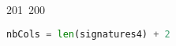 201~200~\documentclass{article}
\begin{document}
\begin{lstlisting}[language=Python, caption=LLL Algorithm to crack private key chall 4]
	                                                                        	                                                                    	                                	                    	                    	                        	                        	                    	                                                                	                	                                                                    	                    							                                                                                                                                                                                                    		                                                                                                                        				    			                                                                                                    nbCols = len(signatures4) + 2
	                                                                        	                                                                    	                                	                    	                    	                        	                        	                    	                                                                	                	                                                                    	                    							                                                                                                                                                                                                    		                                                                                                                        				    			                                                                                                        nbRows = nbCols
	                                                                        	                                                                    	                                	                    	                    	                        	                        	                    	                                                                	                	                                                                    	                    							                                                                                                                                                                                                    		                                                                                                                        				    			                                                                                                            Aspace = MatrixSpace(QQ, nbRows, nbCols)


\end{lstlisting}
\end{document}
